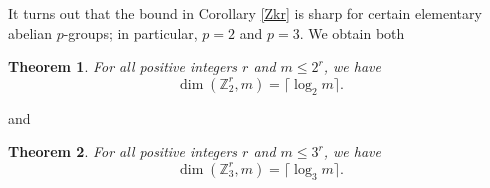 \documentclass[11pt]{article}
\newcommand{\Z}{\mathbb{Z}}
\newtheorem{thm}{Theorem}
\begin{document}
It turns out that the bound in Corollary \ref{Zkr} is sharp for certain elementary abelian $p$-groups; in particular, $p=2$ and $p=3$. We obtain both


\newcommand{\B}{\mathcal{B}}
\begin{thm}\label{Z2r}
For all positive integers $r$ and $m\leq 2^r$, we have $$\dim(\Z_2^r,m)=\lceil\log_2 m\rceil.$$
\end{thm}
and
\begin{thm}\label{Z3r}
For all positive integers $r$ and $m\leq3^r$, we have
\[\dim(\Z_3^r,m)=\lceil \log_3 m \rceil.\]
\end{thm}
\end{document}
